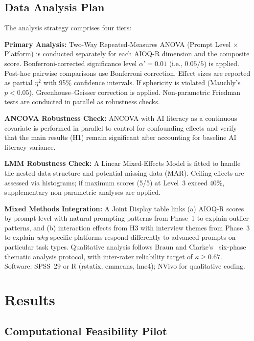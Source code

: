 \documentclass[runningheads]{llncs}
\begin{document}
\subsection{Data Analysis Plan}

The analysis strategy comprises four tiers:

\textbf{Primary Analysis:} Two-Way Repeated-Measures ANOVA (Prompt Level $\times$ Platform) is conducted separately for each AIOQ-R dimension and the composite score. Bonferroni-corrected significance level $\alpha' = 0.01$ (i.e., $0.05 / 5$) is applied. Post-hoc pairwise comparisons use Bonferroni correction. Effect sizes are reported as partial $\eta^2$ with 95\% confidence intervals. If sphericity is violated (Mauchly's $p < 0.05$), Greenhouse--Geisser correction is applied. Non-parametric Friedman tests are conducted in parallel as robustness checks.

\textbf{ANCOVA Robustness Check:} ANCOVA with AI literacy as a continuous covariate is performed in parallel to control for confounding effects and verify that the main results (H1) remain significant after accounting for baseline AI literacy variance.

\textbf{LMM Robustness Check:} A Linear Mixed-Effects Model is fitted to handle the nested data structure and potential missing data (MAR). Ceiling effects are assessed via histograms; if maximum scores (5/5) at Level~3 exceed 40\%, supplementary non-parametric analyses are applied.

\textbf{Mixed Methods Integration:} A Joint Display table links (a) AIOQ-R scores by prompt level with natural prompting patterns from Phase~1 to explain outlier patterns, and (b) interaction effects from H3 with interview themes from Phase~3 to explain \emph{why} specific platforms respond differently to advanced prompts on particular task types. Qualitative analysis follows Braun and Clarke's~\cite{Braun2006} six-phase thematic analysis protocol, with inter-rater reliability target of $\kappa \geq 0.67$. Software: SPSS~29 or R (rstatix, emmeans, lme4); NVivo for qualitative coding.

\section{Results}\label{sec:results}

\subsection{Computational Feasibility Pilot}\label{sec:pilot}
\end{document}
